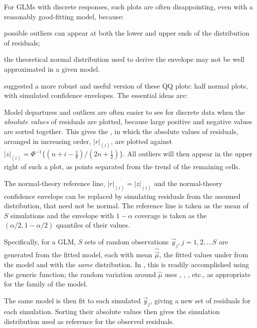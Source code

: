 \documentclass[11pt]{book}\usepackage[]{graphicx}\usepackage[]{color}
\begin{document}
For GLMs with discrete responses, such plots are often disappointing, even with a
reasonably good-fitting model, because:
\begin{seriate}
  \item possible outliers can appear at both the lower and upper ends of the distribution of residuals;
  \item the theoretical normal distribution used to derive the envelope may not be well approximated in
  a given model.
\end{seriate}

\citet{Atkinson:81,Atkinson:87} suggested a more robust and useful version of these QQ plots:
half normal plots, with simulated confidence envelopes.
The essential ideas are:
\begin{itemize*}
 \item Model departures and outliers are often easier to see for
discrete data when the \emph{absolute values} of residuals are plotted,
because large positive and negative values are sorted together.
This gives the , in which the
absolute values of residuals,  arranged in increasing order, $|r|_{(i)}$,
are plotted
against
$|z|_{(i)} = \Phi^{-1} \{ (n+i-\frac{1}{8}) / (2n + \frac{1}{2}) \}$.
All outliers will then appear  in the upper right of such a plot,
as points separated from the trend of the remaining cells.

  \item The normal-theory reference line, $|r|_{(i)} = |z|_{(i)}$
and the normal-theory confidence envelope can be replaced by simulating residuals
from the assumed distribution, that need not be normal.
The reference line is taken as the mean
of $S$ simulations and the envelope with $1-\alpha$ coverage is taken as
the $(\alpha/2, 1-\alpha/2)$ quantiles of their values.

  \item Specifically, for a GLM, $S$ sets of random observations $\vec{y}_j, j=1, 2, \dots S$
are generated from the fitted model, each with mean $\widehat{\vec{\mu}}$,
the fitted values under from the model and with the \emph{same} distribution.
In \R, this is readily accomplished using the generic
 function;
the random variation around $\widehat{\mu}$ uses , ,
, etc., as appropriate for the family of the model.

  \item The same model is then fit
to each simulated $\vec{y}_j$, giving a new set of residuals for each simulation.
Sorting their absolute values then gives the simulation distribution used as
reference for the observed residuals.
\end{itemize*}
\end{document}
